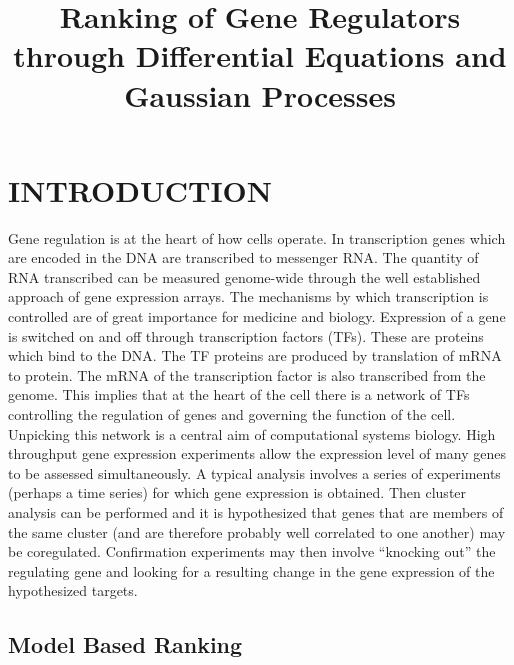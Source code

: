 \documentclass{article}
\title{Ranking of Gene Regulators through Differential Equations and Gaussian Processes}
\begin{document}
\maketitle

\begin{abstract}
\end{abstract}

\section{INTRODUCTION}

Gene regulation is at the heart of how cells operate. In transcription
genes  which are  encoded in  the  DNA are  transcribed to  messenger
RNA.  The  quantity of  RNA  transcribed  can  be measured  genome-wide
through the  well established approach of gene  expression arrays. The
mechanisms  by   which  transcription  is  controlled   are  of  great
importance for medicine and biology.  Expression of a gene is switched
on  and off through  transcription factors  (TFs). These  are proteins
which bind to the DNA. The  TF proteins are produced by translation of
mRNA  to  protein.  The  mRNA  of the  transcription  factor  is  also
transcribed from  the genome.  This implies that  at the heart  of the
cell there is a network of TFs controlling the regulation of genes and
governing  the function  of  the  cell. Unpicking  this  network is  a
central  aim of  computational systems  biology. High  throughput gene
expression experiments allow the expression  level of many genes to be
assessed  simultaneously.  A typical  analysis  involves  a series  of
experiments  (perhaps a  time  series) for  which  gene expression  is
obtained.  Then   cluster  analysis  can   be  performed  and   it  is
hypothesized that genes that are  members of the same cluster (and are
therefore   probably  well   correlated   to  one   another)  may   be
coregulated.  Confirmation  experiments  may then  involve  ``knocking
out'' the  regulating gene and looking  for a resulting  change in the
gene expression of the hypothesized targets.

\subsection{Model Based Ranking}
\end{document}
